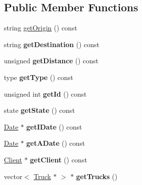 \subsection*{Public Member Functions}
\begin{DoxyCompactItemize}
\item 
string \hyperlink{class_service_a2142a2fd589d94614694a71d9e7c2647}{get\+Origin} () const
\item 
\mbox{\label{class_service_a739e634d2f98145f67db2221aee02d7d}} 
string {\bfseries get\+Destination} () const
\item 
\mbox{\label{class_service_a7b36594e1a24656f065f7d41b79bb718}} 
unsigned {\bfseries get\+Distance} () const
\item 
\mbox{\label{class_service_a75f96cd94a42b604ff179343576e1bba}} 
type {\bfseries get\+Type} () const
\item 
\mbox{\label{class_service_a5a19731d4fa91658afe908167fe66ad6}} 
unsigned int {\bfseries get\+Id} () const
\item 
\mbox{\label{class_service_adf7f337e38c8de87e82b42f15c7ccad3}} 
state {\bfseries get\+State} () const
\item 
\mbox{\label{class_service_a3a8b665eff7933227303dc070bb29485}} 
\hyperlink{class_date}{Date} $\ast$ {\bfseries get\+I\+Date} () const
\item 
\mbox{\label{class_service_a2b08c3d53ab2246eb3cca649c2baa100}} 
\hyperlink{class_date}{Date} $\ast$ {\bfseries get\+A\+Date} () const
\item 
\mbox{\label{class_service_a4a9cc0a45f030f69b3d6468df5d02aaa}} 
\hyperlink{class_client}{Client} $\ast$ {\bfseries get\+Client} () const
\item 
\mbox{\label{class_service_a5d4a097657f1cce3b60ab805fbfb0c80}} 
vector$<$ \hyperlink{class_truck}{Truck} $\ast$ $>$ $\ast$ {\bfseries get\+Trucks} ()
\item 
\mbox{\label{class_service_ac5dca2c1b78ff990827554d4ac9c5990}} 

\end{DoxyCompactItemize}
